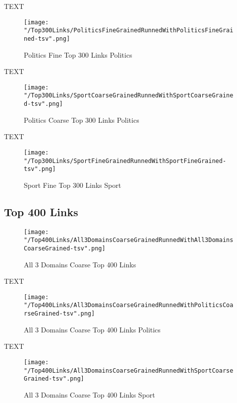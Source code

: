 \documentclass[thesis=M,english]{FITthesis}[2018/05/30]
\begin{document}
	TEXT	

	\begin{figure}\centering
		\texttt{[image: "/Top300Links/PoliticsFineGrainedRunnedWithPoliticsFineGrained-tsv".png]}
		\caption{Politics Fine Top 300 Links Politics}\label{}
	\end{figure}

	
	TEXT

	\begin{figure}\centering
		\texttt{[image: "/Top300Links/SportCoarseGrainedRunnedWithSportCoarseGrained-tsv".png]}
		\caption{Politics Coarse Top 300 Links Politics}\label{}
	\end{figure}		
	
		TEXT	

	\begin{figure}\centering
		\texttt{[image: "/Top300Links/SportFineGrainedRunnedWithSportFineGrained-tsv".png]}
		\caption{Sport Fine Top 300 Links Sport}\label{}	
	\end{figure}

\subsection{Top 400 Links}

	\begin{figure}\centering
		\texttt{[image: "/Top400Links/All3DomainsCoarseGrainedRunnedWithAll3DomainsCoarseGrained-tsv".png]}
		\caption{All 3 Domains Coarse Top 400 Links}\label{}
	\end{figure}

	TEXT

	\begin{figure}\centering
		\texttt{[image: "/Top400Links/All3DomainsCoarseGrainedRunnedWithPoliticsCoarseGrained-tsv".png]}
		\caption{All 3 Domains Coarse Top 400 Links Politics}\label{}
	\end{figure}	

	TEXT	

	\begin{figure}\centering
		\texttt{[image: "/Top400Links/All3DomainsCoarseGrainedRunnedWithSportCoarseGrained-tsv".png]}
		\caption{All 3 Domains Coarse Top 400 Links Sport}\label{}
	\end{figure}
	
\end{document}
